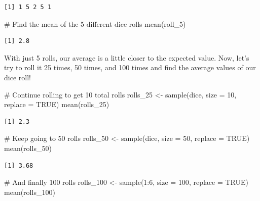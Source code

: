 \documentclass[
  letterpaper,
  DIV=11,
  numbers=noendperiod]{scrreprt}
\newenvironment{Shaded}{\begin{snugshade}}{\end{snugshade}}
\newcommand{\AttributeTok}[1]{\textcolor[rgb]{0.40,0.45,0.13}{#1}}
\newcommand{\CommentTok}[1]{\textcolor[rgb]{0.37,0.37,0.37}{#1}}
\newcommand{\ConstantTok}[1]{\textcolor[rgb]{0.56,0.35,0.01}{#1}}
\newcommand{\DecValTok}[1]{\textcolor[rgb]{0.68,0.00,0.00}{#1}}
\newcommand{\FunctionTok}[1]{\textcolor[rgb]{0.28,0.35,0.67}{#1}}
\newcommand{\NormalTok}[1]{\textcolor[rgb]{0.00,0.23,0.31}{#1}}
\newcommand{\OtherTok}[1]{\textcolor[rgb]{0.00,0.23,0.31}{#1}}
\newcommand{\SpecialCharTok}[1]{\textcolor[rgb]{0.37,0.37,0.37}{#1}}
\begin{document}
\begin{verbatim}
[1] 1 5 2 5 1
\end{verbatim}

\begin{Shaded}
\begin{Highlighting}[]
\CommentTok{\# Find the mean of the 5 different dice rolls}
\FunctionTok{mean}\NormalTok{(roll\_5)}
\end{Highlighting}
\end{Shaded}

\begin{verbatim}
[1] 2.8
\end{verbatim}

With just 5 rolls, our average is a little closer to the expected value.
Now, let's try to roll it 25 times, 50 times, and 100 times and find the
average values of our dice roll!

\begin{Shaded}
\begin{Highlighting}[]
\CommentTok{\# Continue rolling to get 10 total rolls}
\NormalTok{rolls\_25 }\OtherTok{\textless{}{-}} \FunctionTok{sample}\NormalTok{(dice, }\AttributeTok{size =} \DecValTok{10}\NormalTok{, }\AttributeTok{replace =} \ConstantTok{TRUE}\NormalTok{)}
\FunctionTok{mean}\NormalTok{(rolls\_25)}
\end{Highlighting}
\end{Shaded}

\begin{verbatim}
[1] 2.3
\end{verbatim}

\begin{Shaded}
\begin{Highlighting}[]
\CommentTok{\# Keep going to 50 rolls}
\NormalTok{rolls\_50 }\OtherTok{\textless{}{-}} \FunctionTok{sample}\NormalTok{(dice, }\AttributeTok{size =} \DecValTok{50}\NormalTok{, }\AttributeTok{replace =} \ConstantTok{TRUE}\NormalTok{)}
\FunctionTok{mean}\NormalTok{(rolls\_50)}
\end{Highlighting}
\end{Shaded}

\begin{verbatim}
[1] 3.68
\end{verbatim}

\begin{Shaded}
\begin{Highlighting}[]
\CommentTok{\# And finally 100 rolls}
\NormalTok{rolls\_100 }\OtherTok{\textless{}{-}} \FunctionTok{sample}\NormalTok{(}\DecValTok{1}\SpecialCharTok{:}\DecValTok{6}\NormalTok{, }\AttributeTok{size =} \DecValTok{100}\NormalTok{, }\AttributeTok{replace =} \ConstantTok{TRUE}\NormalTok{)}
\FunctionTok{mean}\NormalTok{(rolls\_100)}
\end{Highlighting}
\end{Shaded}
\end{document}
